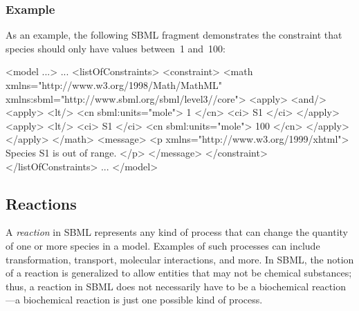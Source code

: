 \subsubsection{Example}

As an example, the following SBML fragment demonstrates the
constraint that species  should only have values between~1
and~100:

\begin{example}
<model ...>
    ...
    <listOfConstraints>
        <constraint>
            <math xmlns="http://www.w3.org/1998/Math/MathML"
                  xmlns:sbml="http://www.sbml.org/sbml/level3/\thisvlc/core">
                <apply>
                    <and/>
                        <apply> 
                            <lt/>
                            <cn sbml:units="mole"> 1 </cn> 
                            <ci> S1 </ci>
                        </apply>
                        <apply>
                            <lt/>
                            <ci> S1 </ci> 
                            <cn sbml:units="mole"> 100 </cn> 
                        </apply>
                </apply>
            </math>
            <message>
                <p xmlns="http://www.w3.org/1999/xhtml"> Species S1 is out of range. </p>
            </message>
        </constraint>
    </listOfConstraints>
    ...
</model>
\end{example}


\subsection{Reactions}
\label{sec:reactions}

A \emph{reaction} in SBML represents any kind of process that can
change the quantity of one or more species in a model.  Examples
of such processes can include transformation, transport, molecular
interactions, and more.  In SBML, the notion of a reaction is
generalized to allow entities that may not be chemical substances;
thus, a reaction in SBML does not necessarily have to be a
biochemical reaction---a biochemical reaction is just one possible
kind of process.

